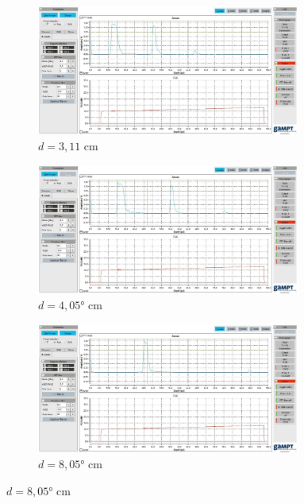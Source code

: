 \begin{figure}
  \centering
  \begin{subfigure}{0.7\textwidth}
    \centering
    \includegraphics[width=0.95\textwidth]{screens/d311.jpg}
    \caption{$d = 3,11$ cm}
    \label{fig:0-deg}
  \end{subfigure}

  \begin{subfigure}{0.7\textwidth}
    \centering
    \includegraphics[width=0.95\textwidth]{screens/d405.jpg}
    \caption{$d = 4,05°$ cm}
    \label{fig:45-deg}
  \end{subfigure}

  \begin{subfigure}{0.7\textwidth}
    \centering
    \includegraphics[width=0.95\textwidth]{screens/d805.jpg}
    \caption{$d = 8,05°$ cm}
    \label{fig:90-deg}
  \end{subfigure}


\end{figure}
